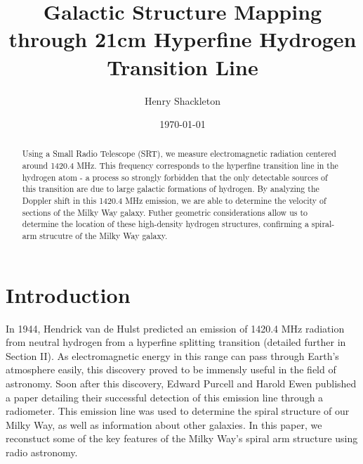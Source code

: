 \usepackage{graphicx}      %
\usepackage{lipsum}
\usepackage{float}
\usepackage{bm}            %
\usepackage{physics}
\usepackage{tensor}
\usepackage{gensymb}
\usepackage[colorlinks=true]{hyperref}  %




\title{Galactic Structure Mapping through 21cm Hyperfine Hydrogen Transition Line}
\author{Henry Shackleton}
\date{\today}


\begin{abstract}
  Using a Small Radio Telescope (SRT), we measure electromagnetic radiation centered around 1420.4 MHz. This frequency corresponds to the hyperfine transition line in the hydrogen atom - a process so strongly forbidden that the only detectable sources of this transition are due to large galactic formations of hydrogen. By analyzing the Doppler shift in this 1420.4 MHz emission, we are able to determine the velocity of sections of the Milky Way galaxy. Futher geometric considerations allow us to determine the location of these high-density hydrogen structures, confirming a spiral-arm strucutre of the Milky Way galaxy.
\end{abstract}

\maketitle

\section{Introduction}
In 1944, Hendrick van de Hulst predicted an emission of 1420.4 MHz radiation from neutral hydrogen from a hyperfine splitting transition (detailed further in Section II). As electromagnetic energy in this range can pass through Earth's atmosphere easily, this discovery proved to be immensly useful in the field of astronomy. Soon after this discovery, Edward Purcell and Harold Ewen published a paper detailing their successful detection of this emission line through a radiometer. This emission line was used to determine the spiral structure of our Milky Way, as well as information about other galaxies. In this paper, we reconstuct some of the key features of the Milky Way's spiral arm structure using radio astronomy.

